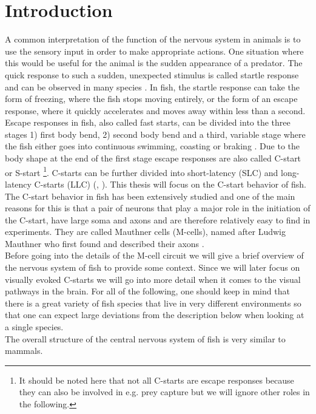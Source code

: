 \documentclass[a4paper,10pt,hidelinks]{scrreprt}
\begin{document}
	\chapter{Introduction}
	A common interpretation of the function of the nervous system in animals is to use the sensory 
	input in order to make appropriate actions.
	One situation where this would be useful for the animal is the sudden appearance of a predator.
	The quick response to such a sudden, unexpected stimulus is called startle response and can be 
	observed in many species \citep{Eaton1984a}.
	In fish, the startle response can take the form of freezing, where the fish	stops moving 
	entirely, or the form of an escape response, where it quickly accelerates and moves away within 
	less than a second.
	Escape responses in fish, also called fast starts, can be divided into the three stages 1) 
	first body bend, 2) second body bend and a third, variable stage where the fish either goes 
	into continuous swimming, coasting or braking \citep{Domenici2011}.
	Due to the body shape at the end of the first stage escape responses are also called C-start or 
	S-start \citep{Domenici2011}\footnote{It should be noted here that not all C-starts are escape 
	responses because they can also be involved in e.g. prey capture but we will ignore other roles 
	in the following.}.
    C-starts can be further divided into short-latency (SLC) and long-latency C-starts (LLC) (\cite{Burgess2007}, \cite{Domenici2010}).
	This thesis will focus on the C-start behavior of fish.\\
	The C-start behavior in fish has been extensively studied and one of the main reasons for this 
	is that a pair of neurons that play a major role in the initiation of the C-start, have large 
	soma and axons and are therefore relatively easy to find in experiments.
	They are called Mauthner cells (M-cells), named after Ludwig Mauthner who first found and 
	described their axons \citep{Mauthner1859}.\\
	Before going into the details of the M-cell circuit we will give a brief overview of the 
	nervous system of fish to provide some context.
	Since we will later focus on visually evoked C-starts we will go into more detail when it comes 
	to the visual pathways in the brain.
    For all of the following, one should keep in mind that there is a great variety of fish species that live in very different environments so that one can expect large deviations from the description below when looking at a single species.\\
	The overall structure of the central nervous system of fish is very similar to mammals.
\end{document}

